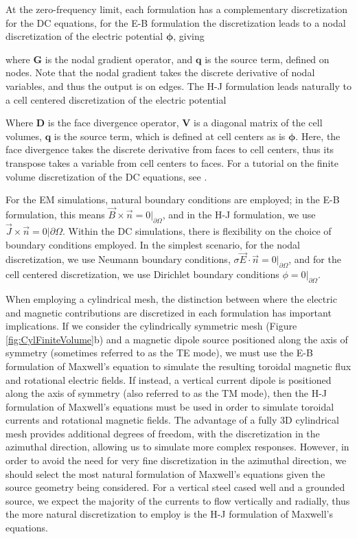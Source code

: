 At the zero-frequency limit, each formulation has a complementary discretization for the DC equations, for the E-B formulation the discretization leads to a nodal discretization of the electric potential $\boldsymbol{\phi}$, giving

where $\mathbf{G}$ is the nodal gradient operator, and $\mathbf{q}$ is the source term, defined on nodes. Note that the nodal gradient takes the discrete derivative of nodal variables, and thus the output is on edges. The H-J formulation leads naturally to a cell centered discretization of the electric potential

Where $\mathbf{D}$ is the face divergence operator, $\mathbf{V}$ is a diagonal matrix of the cell volumes, $\mathbf{q}$ is the source term, which is  defined at cell centers as is $\boldsymbol{\phi}$. Here, the face divergence takes the discrete derivative from faces to cell centers, thus its transpose takes a variable from cell centers to faces. For a tutorial on the finite volume discretization of the DC equations, see \citep{Cockett2016}.

For the EM simulations, natural boundary conditions are employed; in the E-B formulation, this means $\vec{B}\times\vec{n} = 0\vert_{\partial \Omega}$, and in the H-J formulation, we use $\vec{J}\times\vec{n} = 0\vert{\partial \Omega}$. Within the DC simulations, there is flexibility on the choice of boundary conditions employed. In the simplest scenario, for the nodal discretization, we use Neumann boundary conditions, $\sigma\vec{E} \cdot \vec{n} = 0\vert_{\partial \Omega}$, and for the cell centered discretization, we use Dirichlet boundary conditions $\phi = 0\vert_{\partial \Omega}$.

When employing a cylindrical mesh, the distinction between where the electric and magnetic contributions are discretized in each formulation has important implications. If we consider the cylindrically symmetric mesh (Figure \ref{fig:CylFiniteVolume}b) and a magnetic dipole source positioned along the axis of symmetry (sometimes referred to as the TE mode), we must use the E-B formulation of Maxwell's equation to simulate the resulting toroidal magnetic flux and rotational electric fields. If instead, a vertical current dipole is positioned along the axis of symmetry (also referred to as the TM mode), then the H-J formulation of Maxwell's equations must be used in order to simulate toroidal currents and rotational magnetic fields. The advantage of a fully 3D cylindrical mesh provides additional degrees of freedom, with the discretization in the azimuthal direction, allowing us to simulate more complex responses. However, in order to avoid the need for very fine discretization in the azimuthal direction, we should select the most natural formulation of Maxwell's equations given the source geometry being considered. For a vertical steel cased well and a grounded source, we expect the majority of the currents to flow vertically and radially, thus the more natural discretization to employ is the H-J formulation of Maxwell's equations.

